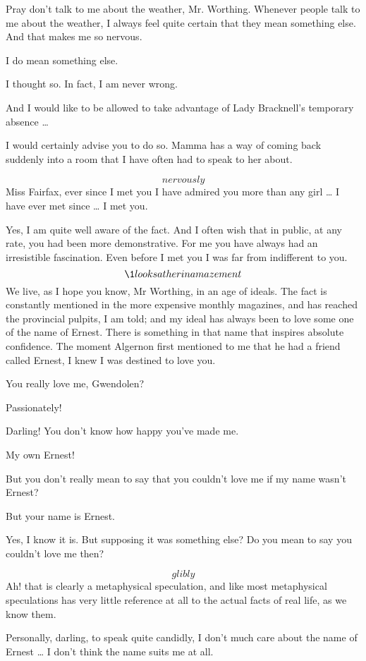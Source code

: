 \documentclass{book}
\begin{document}
\4  Pray don't talk to me about the weather, Mr. Worthing.
Whenever people talk to me about the weather, I always feel quite
certain that they mean something else.  And that makes me so
nervous.

\1  I do mean something else.

\4  I thought so.  In fact, I am never wrong.

\1  And I would like to be allowed to take advantage of Lady
Bracknell's temporary absence \ldots{}

\4  I would certainly advise you to do so.  Mamma has a way
of coming back suddenly into a room that I have often had to speak
to her about.

\1  \[nervously\]  Miss Fairfax, ever since I met you I have
admired you more than any girl \ldots{} I have ever met since \ldots{} I
met you.

\4  Yes, I am quite well aware of the fact.  And I often
wish that in public, at any rate, you had been more demonstrative.
For me you have always had an irresistible fascination.  Even
before I met you I was far from indifferent to you.  \[\1 looks at
her in amazement\]  We live, as I hope you know, Mr Worthing, in an
age of ideals.  The fact is constantly mentioned in the more
expensive monthly magazines, and has reached the provincial
pulpits, I am told; and my ideal has always been to love some one
of the name of Ernest.  There is something in that name that
inspires absolute confidence.  The moment Algernon first mentioned
to me that he had a friend called Ernest, I knew I was destined to
love you.

\1  You really love me, Gwendolen?

\4  Passionately!

\1  Darling!  You don't know how happy you've made me.

\4  My own Ernest!

\1  But you don't really mean to say that you couldn't love me
if my name wasn't Ernest?

\4  But your name is Ernest.

\1  Yes, I know it is.  But supposing it was something else?  Do
you mean to say you couldn't love me then?

\4  \[glibly\]  Ah! that is clearly a metaphysical
speculation, and like most metaphysical speculations has very
little reference at all to the actual facts of real life, as we
know them.

\1  Personally, darling, to speak quite candidly, I don't much
care about the name of Ernest \ldots{} I don't think the name suits me
at all.
\end{document}
